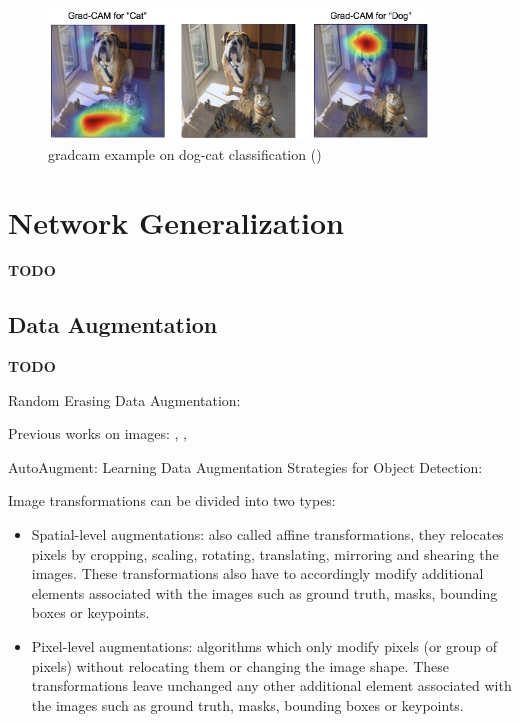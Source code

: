 \begin{figure}[!htb]
\centering
\includegraphics[width=0.9\textwidth]{"contents/images/gradcam/02-gradcam-catdog"}
\caption[\gls{gradcam} example on dog-cat classification]{\gls{gradcam} example on dog-cat classification (\cite{Selvaraju_2019})}
\label{fig:gradcam-catdog}
\end{figure}




\section{Network Generalization}
\label{sec:network-generalization}

\textbf{TODO}



\subsection{Data Augmentation}
\label{subsec:data-augmentation}

\textbf{TODO}

Random Erasing Data Augmentation: \cite{zhong2017random}

Previous works on images:  \cite{yue2019domain}, \cite{Takahashi_2020}, \cite{xie2020unsupervised}

AutoAugment: \cite{cubuk2019autoaugment}
Learning Data Augmentation Strategies for Object Detection: \cite{zoph2019learning}

\medskip

Image transformations can be divided into two types:
\begin{itemize}
	\item Spatial-level augmentations: also called affine transformations, they relocates pixels by cropping, scaling, rotating, translating, mirroring and shearing the images. These transformations also have to accordingly modify additional elements associated with the images such as ground truth, masks, bounding boxes or keypoints.
	\item Pixel-level augmentations: algorithms which only modify pixels (or group of pixels) without relocating them or changing the image shape. These transformations leave unchanged any other additional element associated with the images such as ground truth, masks, bounding boxes or keypoints.
\end{itemize}


